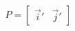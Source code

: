 \documentclass[preview]{standalone}
\begin{document}
\begin{align*}
P = \begin{bmatrix} \vec{i}' & \vec{j}' \end{bmatrix}
\end{align*}
\end{document}
